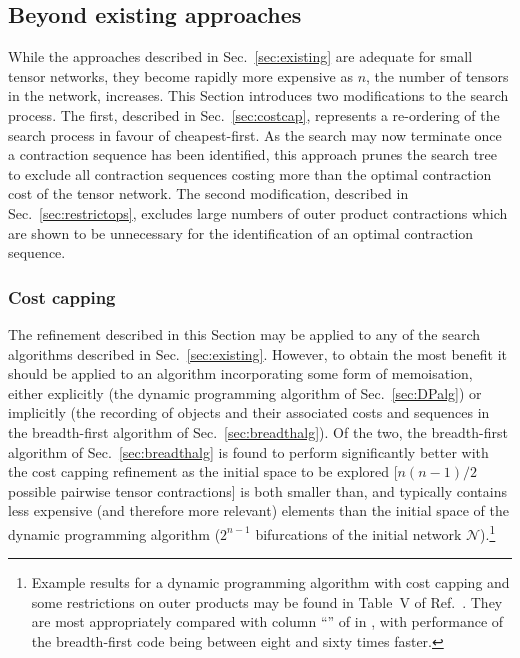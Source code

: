 \documentclass[aps,pre,reprint,superscriptaddress,amsfonts,amsmath,showpacs,nofootinbib,floatfix]{revtex4-1}
\newcommand{\mrm}[1]{\mathrm{#1}}
\newcommand{\mc}[1]{\mathcal{#1}}
\newcommand{\sref}[1]{Sec.~\ref{#1}}
\newcommand{\ptref}[1]{\protect{Table~\ref{#1}}}
\newcommand{\psref}[1]{\protect{Sec.~\ref{#1}}}
\newcommand{\prcite}[1]{Ref.~\protect{\onlinecite{#1}}}
\begin{document}
\subsection{Beyond existing approaches\label{sec:beyond}}

While the approaches described in \sref{sec:existing} are adequate for small tensor networks, they become rapidly more expensive as $n$, the number of tensors in the network, increases. This Section introduces two modifications to the search process. The first, described in \sref{sec:costcap}, represents a re-ordering of the search process in favour of cheapest-first. As the search may now terminate once a contraction sequence has been identified, this approach prunes the search tree to exclude all contraction sequences costing more than the optimal contraction cost of the tensor network. The second modification, described in \sref{sec:restrictops}, excludes large numbers of outer product contractions which are shown to be unnecessary for the identification of an optimal contraction sequence.

\subsubsection{Cost capping\label{sec:costcap}}

The refinement described in this Section may be applied to any of the search algorithms described in \sref{sec:existing}. However, to obtain the most benefit it should be applied to an algorithm incorporating some form of memoisation, either explicitly (the dynamic programming algorithm of \sref{sec:DPalg}) or implicitly (the recording of objects and their associated costs and sequences in the breadth-first algorithm of \sref{sec:breadthalg}). Of the two, the breadth-first algorithm of \sref{sec:breadthalg} is found to perform significantly better with the cost capping refinement as the initial space to be explored [$n(n-1)/2$  possible pairwise tensor contractions] is both smaller than, and typically contains less expensive (and therefore more relevant) elements than the initial space of the dynamic programming algorithm ($2^{n-1}$ bifurcations of the initial network $\mc{N}$).\footnote{Example results for a dynamic programming algorithm with cost capping and some restrictions on outer products may be found in Table~V of \prcite{pfeifer2013}. They are most appropriately compared with column ``\protect{$\mu_\mrm{cap}$}'' of \ptref{tab:results} in \psref{sec:results}, with performance of the breadth-first code being between eight and sixty times faster.}
\end{document}

